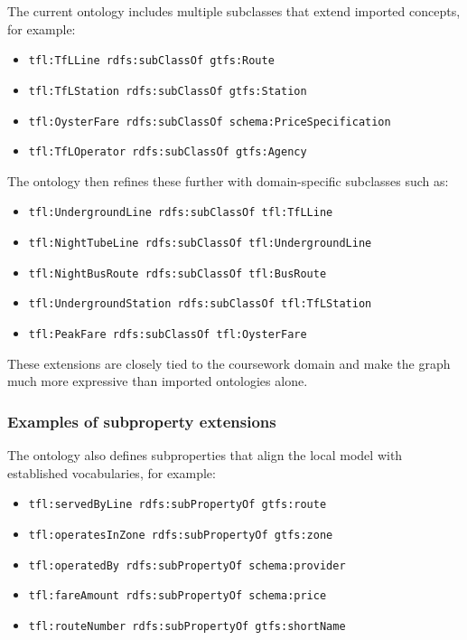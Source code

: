 \documentclass[
  11pt,
  a4paper,
]{article}
\providecommand{\tightlist}{%
  \setlength{\itemsep}{0pt}\setlength{\parskip}{0pt}}
\begin{document}
The current ontology includes multiple subclasses that extend imported
concepts, for example:

\begin{itemize}
\tightlist
\item
  \texttt{tfl:TfLLine\ rdfs:subClassOf\ gtfs:Route}
\item
  \texttt{tfl:TfLStation\ rdfs:subClassOf\ gtfs:Station}
\item
  \texttt{tfl:OysterFare\ rdfs:subClassOf\ schema:PriceSpecification}
\item
  \texttt{tfl:TfLOperator\ rdfs:subClassOf\ gtfs:Agency}
\end{itemize}

The ontology then refines these further with domain-specific subclasses
such as:

\begin{itemize}
\tightlist
\item
  \texttt{tfl:UndergroundLine\ rdfs:subClassOf\ tfl:TfLLine}
\item
  \texttt{tfl:NightTubeLine\ rdfs:subClassOf\ tfl:UndergroundLine}
\item
  \texttt{tfl:NightBusRoute\ rdfs:subClassOf\ tfl:BusRoute}
\item
  \texttt{tfl:UndergroundStation\ rdfs:subClassOf\ tfl:TfLStation}
\item
  \texttt{tfl:PeakFare\ rdfs:subClassOf\ tfl:OysterFare}
\end{itemize}

These extensions are closely tied to the coursework domain and make the
graph much more expressive than imported ontologies alone.

\subsubsection{Examples of subproperty
extensions}\label{examples-of-subproperty-extensions}

The ontology also defines subproperties that align the local model with
established vocabularies, for example:

\begin{itemize}
\tightlist
\item
  \texttt{tfl:servedByLine\ rdfs:subPropertyOf\ gtfs:route}
\item
  \texttt{tfl:operatesInZone\ rdfs:subPropertyOf\ gtfs:zone}
\item
  \texttt{tfl:operatedBy\ rdfs:subPropertyOf\ schema:provider}
\item
  \texttt{tfl:fareAmount\ rdfs:subPropertyOf\ schema:price}
\item
  \texttt{tfl:routeNumber\ rdfs:subPropertyOf\ gtfs:shortName}
\end{itemize}
\end{document}
